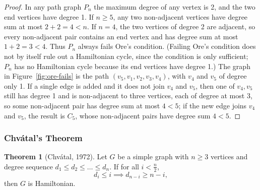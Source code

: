 \documentclass{article}
\theoremstyle{definition}
\newtheorem{theorem}{Theorem}
\begin{document}
\begin{proof}
In any path graph $P_n$ the maximum degree of any vertex is 2, and the two end vertices have degree 1. If $n \geq 5$, any two non-adjacent vertices have degree sum at most $2 + 2 = 4 < n$. If $n = 4$, the two vertices of degree 2 are adjacent, so every non-adjacent pair contains an end vertex and has degree sum at most $1 + 2 = 3 < 4$. Thus $P_n$ always fails Ore's condition. (Failing Ore's condition does not by itself rule out a Hamiltonian cycle, since the condition is only sufficient; $P_n$ has no Hamiltonian cycle because its end vertices have degree 1.) The graph in Figure~\ref{fig:ore-fails} is the path $(v_5, v_1, v_2, v_3, v_4)$, with $v_4$ and $v_5$ of degree only 1. If a single edge is added and it does not join $v_4$ and $v_5$, then one of $v_4, v_5$ still has degree 1 and is non-adjacent to three vertices, each of degree at most 3, so some non-adjacent pair has degree sum at most $4 < 5$; if the new edge joins $v_4$ and $v_5$, the result is $C_5$, whose non-adjacent pairs have degree sum $4 < 5$.
\end{proof}
\subsubsection{Chvátal's Theorem}

\begin{theorem}[Chvátal, 1972]
Let $G$ be a simple graph with $n \geq 3$ vertices and degree sequence $d_1 \leq d_2 \leq \ldots \leq d_n$. If for all $i < \frac{n}{2}$, 
\[d_i \leq i \implies d_{n-i} \geq n-i,\]
then $G$ is Hamiltonian.
\end{theorem}
\end{document}
